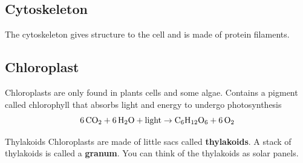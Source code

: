 \documentclass[12pt]{report}
\begin{document}
\subsection{Cytoskeleton}
\begin{definition}[Cytoskeleton]
    The cytoskeleton gives structure to the cell and is made of protein filaments.
\end{definition}

\subsection{Chloroplast}
\begin{definition}[Chloroplast]
    Chloroplasts are only found in plants cells and some algae. Contains a pigment called chlorophyll that absorbs light and energy to undergo photosynthesis 
    \[
        \ce{6CO2}+ \ce{6H2O}+ \text{light}\to \ce{C6H12O6}+ \ce{6O2}
    \]
\end{definition}

\begin{note}{Thylakoids}
Chloroplasts are made of little sacs called \textbf{thylakoids}. A stack of thylakoids is called a \textbf{granum}. You can think of the thylakoids as solar panels.
\end{note}
\end{document}
